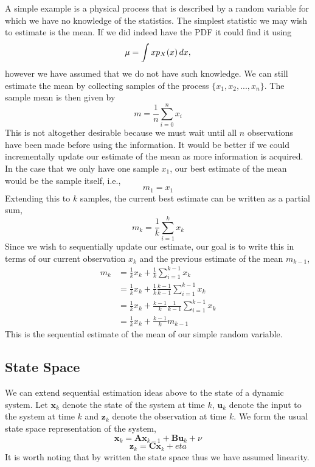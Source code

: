 \documentclass[11pt]{article}
\begin{document}
A simple example is a physical process that is described by a random variable
for which we have no knowledge of the statistics. The simplest statistic we may
wish to estimate is the mean. If we did indeed have the PDF it could find it
using
\begin{equation} \label{eq:someequation}
\mu = \int{xp_{X}(x)\textrm\,{d}x},
\end{equation}
however we have assumed that we do not have such knowledge. We can still
estimate the mean by collecting samples of the process $\{x_{1}, x_{2}, ... ,
x_{n}\}$. The sample mean is then given by
\begin{equation}
m = \frac{1}{n}\sum\limits_{i = 0}^{n}{x_{i}}
\end{equation}
This is not altogether desirable because we must wait until all $n$ observations
have been made before using the information. It would be better if we could
incrementally update our estimate of the mean as more information is acquired.
In the case that we only have one sample $x_{1}$, our best estimate of the mean
would be the sample itself, i.e.,
\begin{equation*}
m_{1} = x_{1}
\end{equation*}
Extending this to $k$ samples, the current best estimate can be written as a
partial sum,
\begin{equation}
m_{k} = \frac{1}{k}\sum\limits_{i = 1}^k{x_{k}}
\end{equation}
Since we wish to sequentially update our estimate, our goal is to write this
in terms of our current observation $x_{k}$ and the previous estimate of the
mean $m_{k-1}$,
\begin{align*}
m_{k} &= \frac{1}{k}x_{k} + \frac{1}{k}\sum\limits_{i = 1}^{k-1}{x_{k}} \\
&= \frac{1}{k}x_{k} + \frac{1}{k}\frac{k-1}{k-1}\sum\limits_{i=1}^{k-1}{x_{k}} \\
&= \frac{1}{k}x_{k} + \frac{k-1}{k}\frac{1}{k-1}\sum\limits_{i=1}^{k-1}{x_{k}} \\
&= \frac{1}{k}x_{k} + \frac{k-1}{k}m_{k-1}
\end{align*}
This is the sequential estimate of the mean of our simple random variable.

\subsection{State Space}
We can extend sequential estimation ideas above to the state of a dynamic
system. Let $\mathbf{x}_{k}$ denote the state of the system at time $k$,
$\mathbf{u}_{k}$ denote the input to the system at time $k$ and
$\mathbf{z}_{k}$ denote the observation at time $k$. We form the usual state
space representation of the system,
\begin{equation}
\mathbf{x}_{k} = \mathbf{A}\mathbf{x}_{k-1} + \mathbf{B}\mathbf{u}_{k} + \nu
\end{equation}
\begin{equation}
\mathbf{z}_{k} = \mathbf{C}\mathbf{x}_{k} + eta
\end{equation}
It is worth noting that by written the state space thus we have assumed
linearity.
\end{document}
